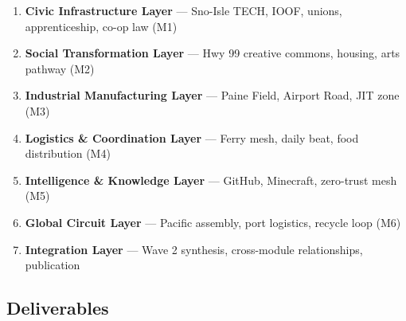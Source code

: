 \documentclass[11pt,letterpaper]{article}
\begin{document}
\begin{enumerate}[leftmargin=*]
  \item \textbf{Civic Infrastructure Layer} --- Sno-Isle TECH, IOOF, unions, apprenticeship, co-op law (M1)
  \item \textbf{Social Transformation Layer} --- Hwy 99 creative commons, housing, arts pathway (M2)
  \item \textbf{Industrial Manufacturing Layer} --- Paine Field, Airport Road, JIT zone (M3)
  \item \textbf{Logistics \& Coordination Layer} --- Ferry mesh, daily beat, food distribution (M4)
  \item \textbf{Intelligence \& Knowledge Layer} --- GitHub, Minecraft, zero-trust mesh (M5)
  \item \textbf{Global Circuit Layer} --- Pacific assembly, port logistics, recycle loop (M6)
  \item \textbf{Integration Layer} --- Wave 2 synthesis, cross-module relationships, publication
\end{enumerate}

\subsection{Deliverables}
\end{document}
